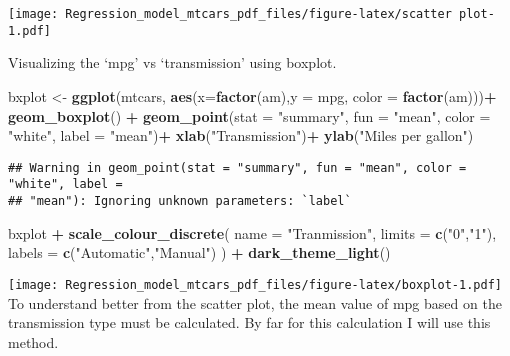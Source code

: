 \documentclass[
]{article}
\newenvironment{Shaded}{\begin{snugshade}}{\end{snugshade}}
\newcommand{\AttributeTok}[1]{\textcolor[rgb]{0.13,0.29,0.53}{#1}}
\newcommand{\FunctionTok}[1]{\textcolor[rgb]{0.13,0.29,0.53}{\textbf{#1}}}
\newcommand{\NormalTok}[1]{#1}
\newcommand{\OtherTok}[1]{\textcolor[rgb]{0.56,0.35,0.01}{#1}}
\newcommand{\SpecialCharTok}[1]{\textcolor[rgb]{0.81,0.36,0.00}{\textbf{#1}}}
\newcommand{\StringTok}[1]{\textcolor[rgb]{0.31,0.60,0.02}{#1}}
\begin{document}
\texttt{[image: Regression\_model\_mtcars\_pdf\_files/figure-latex/scatter plot-1.pdf]}

Visualizing the `mpg' vs `transmission' using boxplot.

\begin{Shaded}
\begin{Highlighting}[]
\NormalTok{    bxplot }\OtherTok{\textless{}{-}} \FunctionTok{ggplot}\NormalTok{(mtcars, }\FunctionTok{aes}\NormalTok{(}\AttributeTok{x=}\FunctionTok{factor}\NormalTok{(am),}\AttributeTok{y =}\NormalTok{ mpg, }\AttributeTok{color =} \FunctionTok{factor}\NormalTok{(am)))}\SpecialCharTok{+}
    \FunctionTok{geom\_boxplot}\NormalTok{() }\SpecialCharTok{+}
    \FunctionTok{geom\_point}\NormalTok{(}\AttributeTok{stat =} \StringTok{"summary"}\NormalTok{,}
              \AttributeTok{fun =} \StringTok{"mean"}\NormalTok{,}
              \AttributeTok{color =} \StringTok{"white"}\NormalTok{, }\AttributeTok{label =} \StringTok{"mean"}\NormalTok{)}\SpecialCharTok{+}
    \FunctionTok{xlab}\NormalTok{(}\StringTok{"Transmission"}\NormalTok{)}\SpecialCharTok{+}
    \FunctionTok{ylab}\NormalTok{(}\StringTok{"Miles per gallon"}\NormalTok{)}
\end{Highlighting}
\end{Shaded}

\begin{verbatim}
## Warning in geom_point(stat = "summary", fun = "mean", color = "white", label =
## "mean"): Ignoring unknown parameters: `label`
\end{verbatim}

\begin{Shaded}
\begin{Highlighting}[]
\NormalTok{bxplot }\SpecialCharTok{+}
    \FunctionTok{scale\_colour\_discrete}\NormalTok{(}
    \AttributeTok{name =} \StringTok{"Tranmission"}\NormalTok{,}
    \AttributeTok{limits =} \FunctionTok{c}\NormalTok{(}\StringTok{"0"}\NormalTok{,}\StringTok{"1"}\NormalTok{),}
    \AttributeTok{labels =} \FunctionTok{c}\NormalTok{(}\StringTok{"Automatic"}\NormalTok{,}\StringTok{"Manual"}\NormalTok{)}
\NormalTok{) }\SpecialCharTok{+} \FunctionTok{dark\_theme\_light}\NormalTok{()}
\end{Highlighting}
\end{Shaded}

\texttt{[image: Regression\_model\_mtcars\_pdf\_files/figure-latex/boxplot-1.pdf]}
To understand better from the scatter plot, the mean value of mpg based
on the transmission type must be calculated. By far for this calculation
I will use this method.
\end{document}
